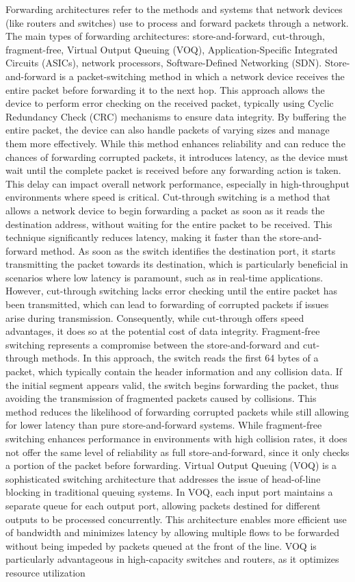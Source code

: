 \documentclass{article}
\begin{document}
	Forwarding architectures refer to the methods and systems that network devices (like routers and switches) use to process and forward packets through a network. The main types of forwarding architectures: store-and-forward, cut-through, fragment-free, Virtual Output Queuing (VOQ), Application-Specific Integrated Circuits (ASICs), network processors, Software-Defined Networking (SDN). Store-and-forward is a packet-switching method in which a network device receives the entire packet before forwarding it to the next hop. This approach allows the device to perform error checking on the received packet, typically using Cyclic Redundancy Check (CRC) mechanisms to ensure data integrity. By buffering the entire packet, the device can also handle packets of varying sizes and manage them more effectively. While this method enhances reliability and can reduce the chances of forwarding corrupted packets, it introduces latency, as the device must wait until the complete packet is received before any forwarding action is taken. This delay can impact overall network performance, especially in high-throughput environments where speed is critical. Cut-through switching is a method that allows a network device to begin forwarding a packet as soon as it reads the destination address, without waiting for the entire packet to be received. This technique significantly reduces latency, making it faster than the store-and-forward method. As soon as the switch identifies the destination port, it starts transmitting the packet towards its destination, which is particularly beneficial in scenarios where low latency is paramount, such as in real-time applications. However, cut-through switching lacks error checking until the entire packet has been transmitted, which can lead to forwarding of corrupted packets if issues arise during transmission. Consequently, while cut-through offers speed advantages, it does so at the potential cost of data integrity. Fragment-free switching represents a compromise between the store-and-forward and cut-through methods. In this approach, the switch reads the first 64 bytes of a packet, which typically contain the header information and any collision data. If the initial segment appears valid, the switch begins forwarding the packet, thus avoiding the transmission of fragmented packets caused by collisions. This method reduces the likelihood of forwarding corrupted packets while still allowing for lower latency than pure store-and-forward systems. While fragment-free switching enhances performance in environments with high collision rates, it does not offer the same level of reliability as full store-and-forward, since it only checks a portion of the packet before forwarding. Virtual Output Queuing (VOQ) is a sophisticated switching architecture that addresses the issue of head-of-line blocking in traditional queuing systems. In VOQ, each input port maintains a separate queue for each output port, allowing packets destined for different outputs to be processed concurrently. This architecture enables more efficient use of bandwidth and minimizes latency by allowing multiple flows to be forwarded without being impeded by packets queued at the front of the line. VOQ is particularly advantageous in high-capacity switches and routers, as it optimizes resource utilization 
\end{document}
